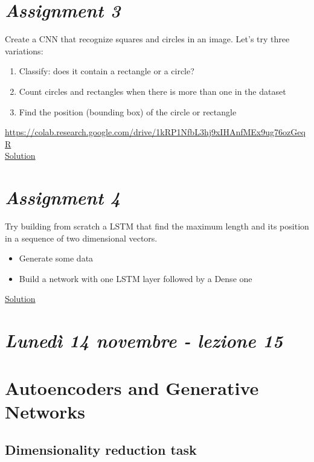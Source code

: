 \section{\textit{Assignment 3}}

Create a CNN that recognize squares and circles in an image. Let’s try three variations:

\begin{enumerate}
	\item Classify: does it contain a rectangle or a circle?
	\item Count circles and rectangles when there is more than one in the dataset
	\item Find the position (bounding box) of the circle or rectangle
\end{enumerate}

\url{https://colab.research.google.com/drive/1kRP1NfbL3hj9xIHAnfMEx9ug76ozGeqR}\\

\href{https://colab.research.google.com/drive/1KHjAsly12wQnrENOgJhF1XKnRFAGmAA6#scrollTo=YiUPPdZ6pNsi}{Solution}


\section{\textit{Assignment 4}}


Try building from scratch a LSTM that find the maximum length and its position in a sequence of two dimensional vectors.\\

\begin{itemize}
	\item Generate some data
	\item Build a network with one LSTM layer followed by a Dense one
\end{itemize}


\href{https://colab.research.google.com/drive/1AyK6r9VG7rV0ZDjqDXu1q0ROEfAAwlU7?usp=sharing}{Solution}


\newpage

\section{\textit{Lunedì 14 novembre - lezione 15}}
\section{Autoencoders and Generative Networks}

\subsection{Dimensionality reduction task}

